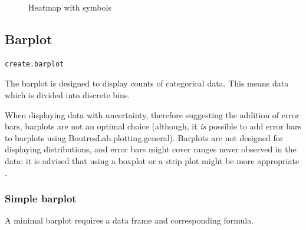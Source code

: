 \documentclass[letterpaper]{report}\usepackage[]{graphicx}\usepackage[]{color}
\newenvironment{knitrout}{}{} %
\begin{document}
\begin{knitrout}
\begin{figure}
{\centering {} 

}

\caption[Heatmap with symbols]{Heatmap with symbols}\label{fig:heatmap9}
\end{figure}


\end{knitrout}

\subsection{Barplot}
\begin{verbatim}
create.barplot
\end{verbatim}

The barplot is designed to display counts of categorical data. This means data which is divided into discrete bins. 

When displaying data with uncertainty, therefore suggesting the addition of error bars, barplots are not an optimal choice (although, it \textit{is} possible to add error bars to barplots using BoutrosLab.plotting.general). Barplots are not designed for displaying distributions, and error bars might cover ranges never observed in the data: it is advised that using a boxplot  or a strip plot might be more appropriate \cite{streit}. 

\subsubsection{Simple barplot}
A minimal barplot requires a data frame and corresponding formula.
\end{document}
